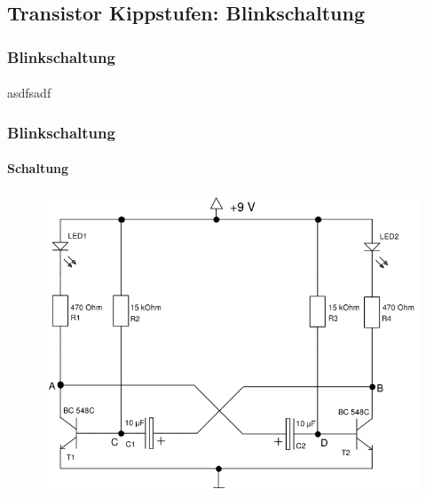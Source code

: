 \subsection{Transistor Kippstufen: Blinkschaltung} %
\label{sub:Transistor_Kippstufen:_Blinkschaltung}
\begin{frame}
    \frametitle{Blinkschaltung}
    \framesubtitle{}
    asdfsadf 
\end{frame}
\begin{frame}
    \frametitle{Blinkschaltung}
    \framesubtitle{Schaltung}
    \begin{figure}[H]
    \begin{center}
            \includegraphics[scale=0.37]{./img/schaltungen/blink.png}
    \end{center}
    \end{figure}
\end{frame}

